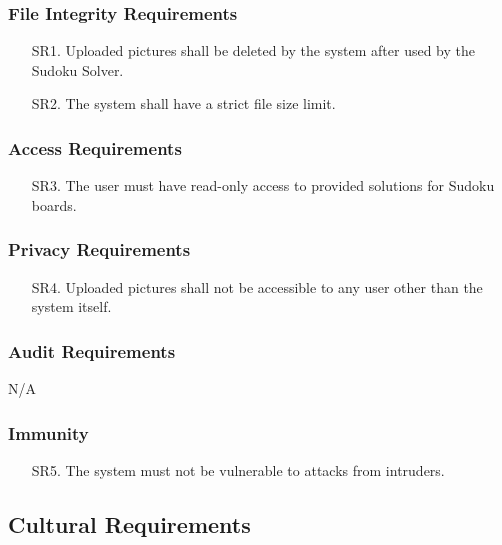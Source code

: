 \documentclass[11pt]{article}
\begin{document}
\subsubsection{File Integrity Requirements}

\begin{enumerate}
    \item [SR1.] Uploaded pictures shall be deleted by the system after used by the Sudoku Solver.
    
    \item [SR2.] The system shall have a strict file size limit.
\end{enumerate}

\subsubsection{Access Requirements}

\begin{enumerate}
    \item [SR3.] The user must have read-only access to provided solutions for Sudoku boards.
\end{enumerate}

\subsubsection{Privacy Requirements}

\begin{enumerate}
    \item [SR4.] Uploaded pictures shall not be accessible to any user other than the system itself.
\end{enumerate}

\subsubsection{Audit Requirements}

N/A

\subsubsection{Immunity}

\begin{enumerate}
    \item [SR5.] The system must not be vulnerable to attacks from intruders.
\end{enumerate}

\subsection{Cultural Requirements}
\end{document}
